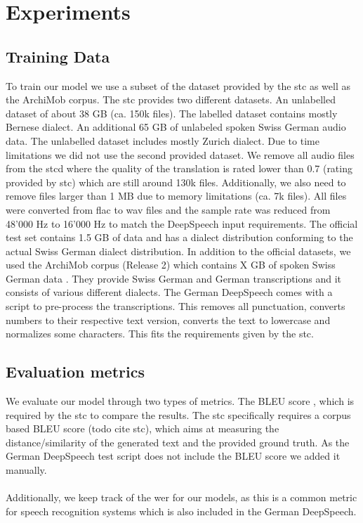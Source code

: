 \section{Experiments}

\subsection{Training Data}
To train our model we use a subset of the dataset provided by the \gls{stc} as well as the ArchiMob corpus. The \gls{stc} provides two different datasets. An unlabelled dataset of about 38 GB (ca. 150k files). The labelled dataset contains mostly Bernese dialect. An additional 65 GB of unlabeled spoken Swiss German audio data. The unlabelled dataset includes mostly Zurich dialect. Due to time limitations we did not use the second provided dataset. We remove all audio files from the \gls{stcd} where the quality of the translation is rated lower than 0.7 (rating provided by \gls{stc}) which are still around 130k files. Additionally, we also need to remove files larger than 1 MB due to memory limitations (ca. 7k files). All files were converted from flac to wav files and the sample rate was reduced from 48'000 Hz to 16'000 Hz to match the DeepSpeech input requirements. The official test set contains 1.5 GB of data \cite{stc2019} and has a dialect distribution conforming to the actual Swiss German dialect distribution. In addition to the official datasets, we used the ArchiMob corpus (Release 2) which contains X GB of spoken Swiss German data \cite{archimob2016}. They provide Swiss German and German transcriptions and it consists of various different dialects. 
The German DeepSpeech comes with a script to pre-process the transcriptions. This removes all punctuation, converts numbers to their respective text version, converts the text to lowercase and normalizes some characters. This fits the requirements given by the \gls{stc}.

\subsection{Evaluation metrics}
We evaluate our model through two types of metrics. The BLEU score \cite{Papineni2002BleuAM}, which is required by the \gls{stc} to compare the results. The \gls{stc} specifically requires a corpus
based BLEU score (todo cite stc), which aims at measuring the distance/similarity of the generated text and the provided ground truth. As the German DeepSpeech test script does not include the BLEU score we added it manually. \\~\\Additionally, we keep track of the \gls{wer} for our models, as
this is a common metric for speech recognition systems \cite{Park2008AnEA} which is also included in the German DeepSpeech.

